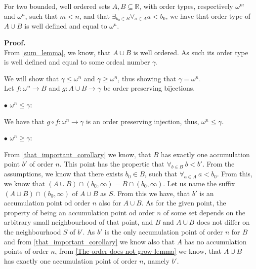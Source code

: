 \begin{lemma}
For two bounded, well ordered sets $A, B \subseteq \mathbb{R}$, with order types, respectively 
$\omega^m$ 
and $\omega^n$, 
such that $m < n$, and that $\exists_{b_0\in B}\forall_{a\in A}a<b_0$, we have 
that order type of $A \cup B$ is well defined and 
equal to $\omega^n$.
\end{lemma}
\textbf{Proof.} \\
From \ref{sum_lemma}, we know, that $A\cup B$ is well ordered. As such its order type is well 
defined and equal to some ordeal number $\gamma$. 

We will show that $\gamma \leq \omega^n$ and $\gamma \geq \omega^n$, 
thus showing that $\gamma = \omega^n$. \\

Let $f : \omega^n \to B$ and $g : A \cup B \to \gamma$ be order preserving bijections. 

$\bullet$ $\omega^n \leq \gamma$: 

We have that  
$g\circ f : \omega^n \to \gamma$ 
is an order preserving injection, thus, $\omega^n \leq \gamma$. 

$\bullet$ $\omega^n \geq \gamma$: 

From \ref{that_important_corollary} we know, that $B$ has exactly one accumulation point $b'$ of 
order $n$. This point has the propertie that $\forall_{b\in B}\ b<b'$.
From the assumptions, we know that there exists $b_0 \in B$, such that $\forall_{a\in A}\ a<b_0$. 
From this, we know that $(A\cup B) \cap (b_0,\infty) = B \cap (b_0, \infty)$. 
Let us name the suffix $(A\cup B) \cap (b_0,\infty)$ of $A\cup B$ as $S$.
From this we have, that $b'$ is an accumulation point od order $n$ also for $A \cup B$. 
As for the given point, the property of being an accumulation point od order $n$ of 
some set depends on the arbitrary small neighbourhood of that point, and $B$ and $A\cup B$ 
does not differ on the neighbourhood $S$ of $b'$. As $b'$ is the only accumulation point of 
order $n$ for $B$ and from \ref{that_important_corollary} we know also that 
$A$ has no accumulation points of order $n$, from \ref{The order does not grow lemma} we know, 
that $A\cup B$ has exactly one accumulation point of order $n$, namely $b'$. 

